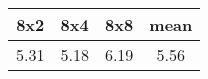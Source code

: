 \begin{tabular}{|c|c|c|c|}
\hline
\textbf{8x2}&\textbf{8x4}&\textbf{8x8}&\textbf{mean}\\\hline
5.31&5.18&6.19&5.56\\\hline
\end{tabular}
